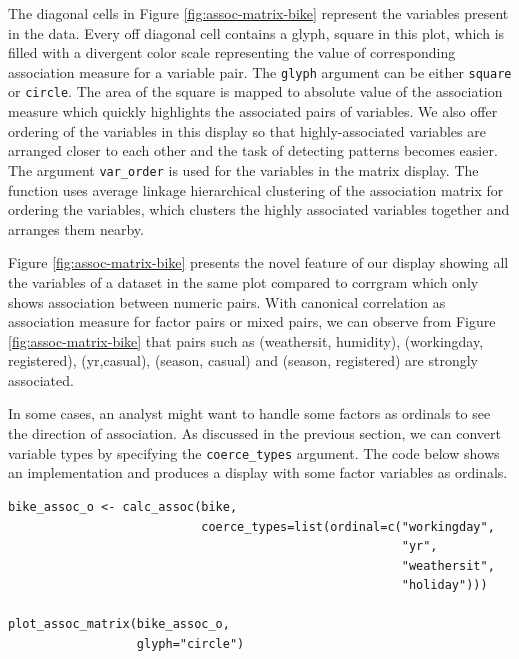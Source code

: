 The diagonal cells in Figure \ref{fig:assoc-matrix-bike} represent the variables present in the data. Every off diagonal cell contains a glyph, square in this plot, which is filled with a divergent color scale representing the value of corresponding association measure for a variable pair. The \texttt{glyph} argument can be either \texttt{square} or \texttt{circle}. The area of the square is mapped to absolute value of the association measure which quickly highlights the associated pairs of variables. We also offer ordering of the variables in this display so that highly-associated variables are arranged closer to each other and the task of detecting patterns becomes easier. The argument \texttt{var\_order} is used for the variables in the matrix display. The function uses average linkage hierarchical clustering of the association matrix for ordering the variables, which clusters the highly associated variables together and arranges them nearby.

Figure \ref{fig:assoc-matrix-bike} presents the novel feature of our display showing all the variables of a dataset in the same plot compared to corrgram which only shows association between numeric pairs. With canonical correlation as association measure for factor pairs or mixed pairs, we can observe from Figure \ref{fig:assoc-matrix-bike} that pairs such as (weathersit, humidity), (workingday, registered), (yr,casual), (season, casual) and (season, registered) are strongly associated.

In some cases, an analyst might want to handle some factors as ordinals to see the direction of association. As discussed in the previous section, we can convert variable types by specifying the \texttt{coerce\_types} argument. The code below shows an implementation and produces a display with some factor variables as ordinals.

\begin{verbatim}
bike_assoc_o <- calc_assoc(bike, 
                           coerce_types=list(ordinal=c("workingday", 
                                                       "yr", 
                                                       "weathersit", 
                                                       "holiday")))

plot_assoc_matrix(bike_assoc_o,
                  glyph="circle")
\end{verbatim}

